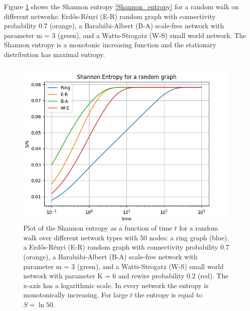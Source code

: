 Figure \ref{Fig:Shannon_entropy} shows the Shannon entropy \eqref{Shannon_entropy} for a random walk on different networks: Erd\H{o}s-Rényi (E-R) random graph with connectivity probability 0.7 (orange), a Barab\'abi-Albert (B-A) scale-free network with parameter m = 3 (green), and a Watts-Strogatz (W-S) small world network. The Shannon entropy is a monotonic increasing function and the stationary distribution has maximal entropy.

\begin{figure}
    \centering
    \includegraphics[width=0.75\linewidth]{image/Shannon_entropy.png}
    \caption{Plot of the Shannon entropy as a function of time $t$ for a random walk over different network types with 50 nodes: a ring graph (blue), a Erd\H{o}s-Rényi (E-R) random graph with connectivity probability 0.7 (orange), a Barab\'abi-Albert (B-A) scale-free network with parameter m = 3 (green), and a Watts-Strogatz (W-S) small world network with parameter K = 6 and rewire probability 0.2 (red). The x-axis has a logarithmic scale. In every network the entropy is monotonically increasing. For large $t$ the entropy is equal to $S = \ln 50$. }
    \label{Fig:Shannon_entropy}
\end{figure}
   

